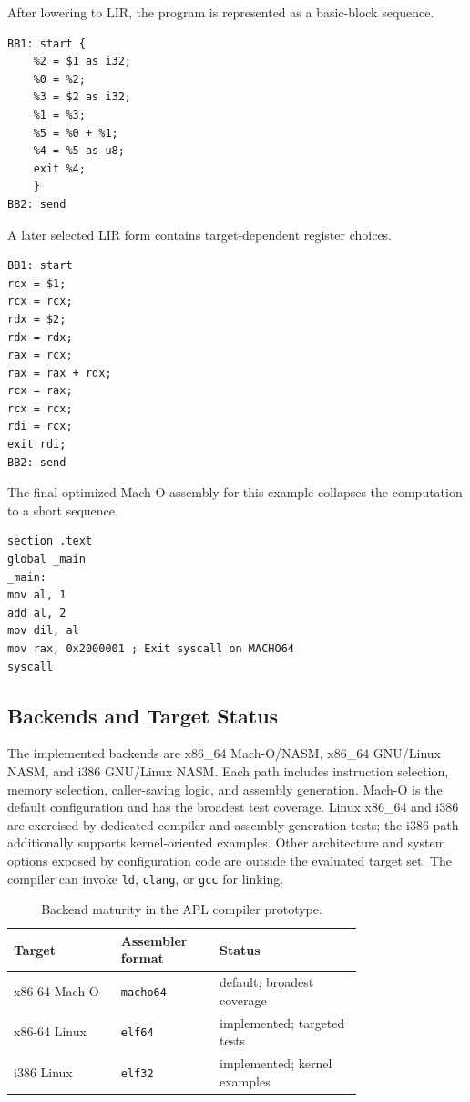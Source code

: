 \documentclass[10pt,twocolumn]{article}
\begin{document}
\par After lowering to LIR, the program is represented as a basic-block sequence.

\begin{lstlisting}[caption={LIR form before target-sensitive selection.}]
BB1: start {
    %2 = $1 as i32;
    %0 = %2;
    %3 = $2 as i32;
    %1 = %3;
    %5 = %0 + %1;
    %4 = %5 as u8;
    exit %4;
    }
BB2: send
\end{lstlisting}

\par A later selected LIR form contains target-dependent register choices.

\begin{lstlisting}[caption={Selected LIR form.}]
BB1: start
rcx = $1;
rcx = rcx;
rdx = $2;
rdx = rdx;
rax = rcx;
rax = rax + rdx;
rcx = rax;
rcx = rcx;
rdi = rcx;
exit rdi;
BB2: send
\end{lstlisting}

\par The final optimized Mach-O assembly for this example collapses the computation to a short sequence.

\begin{lstlisting}[caption={Generated assembly.}]
section .text
global _main
_main:
mov al, 1
add al, 2
mov dil, al
mov rax, 0x2000001 ; Exit syscall on MACHO64
syscall
\end{lstlisting}

\subsection{Backends and Target Status}

\par The implemented backends are x86\_64 Mach-O/NASM, x86\_64 GNU/Linux NASM, and i386 GNU/Linux NASM. Each path includes instruction selection, memory selection, caller-saving logic, and assembly generation. Mach-O is the default configuration and has the broadest test coverage. Linux x86\_64 and i386 are exercised by dedicated compiler and assembly-generation tests; the i386 path additionally supports kernel-oriented examples. Other architecture and system options exposed by configuration code are outside the evaluated target set. The compiler can invoke \texttt{ld}, \texttt{clang}, or \texttt{gcc} for linking.

\begin{table}[t]
\centering
\footnotesize
\caption{Backend maturity in the APL compiler prototype.}
\label{tab:backend-maturity}
\begin{tabular}{p{0.24\linewidth}p{0.20\linewidth}p{0.32\linewidth}}
\toprule
Target        & Assembler format & Status                       \\
\midrule
x86-64 Mach-O & \texttt{macho64} & default; broadest coverage   \\
x86-64 Linux  & \texttt{elf64}   & implemented; targeted tests  \\
i386 Linux    & \texttt{elf32}   & implemented; kernel examples \\
\bottomrule
\end{tabular}
\end{table}
\end{document}
